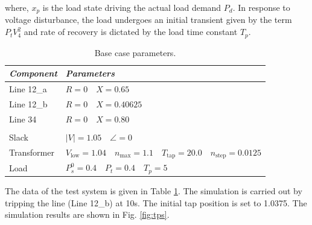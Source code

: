 \documentclass{article}	%
\begin{document}
where, $x_p$ is the load state driving the actual load demand $P_d$. In response to voltage disturbance, the load undergoes an initial transient given by the term $P_t V_4^2$ and rate of recovery is dictated by the load time constant $T_p$.

\begin{table}[H]
  \caption{Base case parameters.}\label{tab:dataps}
  \centering
  \begin{tabular}{p{2cm}l}
    \toprule
    \emph{Component} & \emph{Parameters}                                                                                    \\
    \midrule
    Line 12\_a       & $R=0 \quad X = 0.65$                                                                                 \\
    Line 12\_b       & $R=0 \quad X = 0.40625$                                                                              \\
    Line 34          & $R=0 \quad X = 0.80$                                                                                 \\
                     &                                                                                                      \\
    Slack            & $|V|= 1.05 \quad \angle = 0$                                                                         \\
    Transformer      & $V_\text{low}=1.04 \quad n_\text{max} = 1.1 \quad T_\text{tap} = 20.0 \quad n_\text{step} = 0.0125 $ \\
    Load             & $P_s^0=0.4 \quad P_t = 0.4 \quad T_p = 5  $                                                          \\
    \bottomrule
  \end{tabular}
\end{table}
The data of the test system is given in Table \ref{tab:dataps}. The simulation is carried out by tripping the line (Line 12\_b) at 10s. The initial tap position is set to 1.0375. The simulation results are shown in Fig. \ref{fig:tps}.
\end{document}
